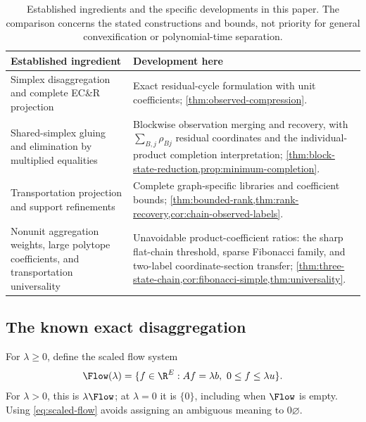 \begin{table}[tb]\centering\small
\caption{Established ingredients and the specific developments in this paper.
The comparison concerns the stated constructions and bounds, not priority
for general convexification or polynomial-time separation.}
\label{tab:prior-comparison}
\begin{tabular}{>{\raggedright\arraybackslash}p{.43\linewidth}
                >{\raggedright\arraybackslash}p{.49\linewidth}}\toprule
Established ingredient & Development here\\\midrule
Simplex disaggregation and complete EC\&R projection
\citep{DavarniaRichardTawarmalani2017,KhademniaDavarnia2025}
& Exact residual-cycle formulation with unit coefficients;
\cref{thm:observed-compression}.\\[4pt]
Shared-simplex gluing and elimination by multiplied equalities
\citep{Davarnia2016,LibertiPantelides2006}
& Blockwise observation merging and recovery, with
$\sum_{B,j}\rho_{Bj}$ residual coordinates and the individual-product
completion interpretation; \cref{thm:block-state-reduction,prop:minimum-completion}.\\[4pt]
Transportation projection and support refinements
\citep{KisHorvath2022,GritzmannSturmfels1993,OnnRothblum2004}
& Complete graph-specific libraries and coefficient bounds;
\cref{thm:bounded-rank,thm:rank-recovery,cor:chain-observed-labels}.\\[4pt]
Nonunit aggregation weights, large polytope coefficients,
and transportation universality
\citep{KhademniaDavarnia2025,AlonVu1997,DeLoeraOnn2006}
& Unavoidable product-coefficient ratios: the sharp flat-chain threshold,
sparse Fibonacci family, and two-label coordinate-section transfer;
\cref{thm:three-state-chain,cor:fibonacci-simple,thm:universality}.\\\bottomrule
\end{tabular}
\end{table}

\subsection{The known exact disaggregation}\label{subsec:disaggregation}
For $\lambda\ge0$, define the scaled flow system
\begin{equation}\label{eq:scaled-flow}
 \Flow(\lambda)=\{f\in\R^E:Af=\lambda b,\ 0\le f\le\lambda u\}.
\end{equation}
For $\lambda>0$, this is $\lambda\Flow$; at $\lambda=0$ it is $\{0\}$,
including when $\Flow$ is empty. Using \eqref{eq:scaled-flow} avoids assigning
an ambiguous meaning to $0\varnothing$.

